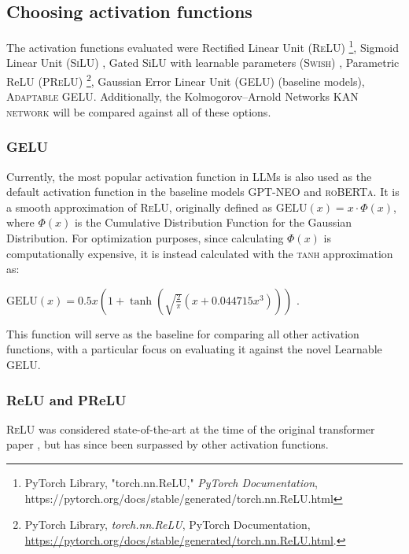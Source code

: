 \subsection{Choosing activation functions}
The activation functions evaluated were Rectified Linear Unit (\textsc{ReLU}) \footnote{PyTorch Library, "torch.nn.ReLU," \textit{PyTorch Documentation}, https://pytorch.org/docs/stable/generated/torch.nn.ReLU.html}, Sigmoid Linear Unit (\textsc{SiLU}) \cite{Hendrycks2023}, Gated SiLU with learnable parameters (\textsc{Swish}) \cite{eger_is_2019}, Parametric ReLU (\textsc{PReLU}) \footnote{PyTorch Library, \textit{torch.nn.ReLU}, PyTorch Documentation, \url{https://pytorch.org/docs/stable/generated/torch.nn.ReLU.html}.}, Gaussian Error Linear Unit (\textsc{GELU}) (baseline models), \textsc{Adaptable GELU}. Additionally, the Kolmogorov–Arnold Networks \textsc{KAN network} \cite{Liu2024} will be compared against all of these options.

\subsubsection{GELU}
Currently, the most popular activation function in LLMs is also used as the default activation function in the baseline models \textsc{GPT-NEO} and \textsc{roBERTa}. It is a smooth approximation of \textsc{ReLU}, originally defined as \(\text{GELU}(x) = x \cdot \Phi(x)\), where \(\Phi(x)\)
is the Cumulative Distribution Function for the Gaussian Distribution. For optimization purposes, since calculating \(\Phi(x)\) is computationally expensive, it is instead calculated with the \textsc{tanh} approximation as:

\(\text{GELU}(x) = 0.5x \left(1 + \tanh\left(\sqrt{\frac{2}{\pi}} \left(x + 0.044715x^3\right)\right)\right)\) \cite{Hendrycks2023}. 

This function will serve as the baseline for comparing all other activation functions, with a particular focus on evaluating it against the novel Learnable GELU.

\subsubsection{ReLU and PReLU}
\textsc{ReLU} was considered state-of-the-art at the time of the original transformer paper \cite{Vaswani2017}, but has since been surpassed by other activation functions.

